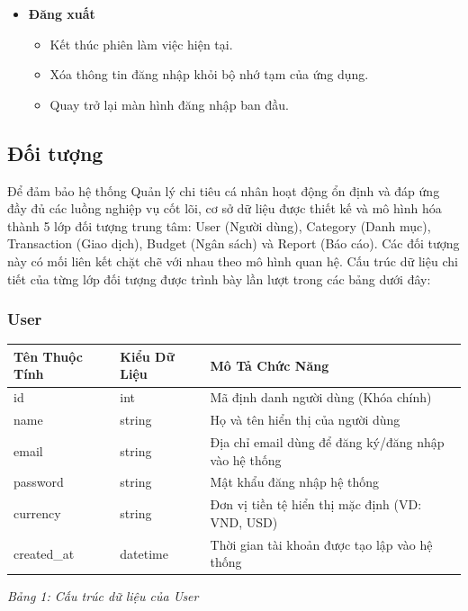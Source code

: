 \documentclass[12pt,letterpaper]{article}
\begin{document}
\begin{itemize}
\item \textbf{Đăng xuất}
\begin{itemize}
\item Kết thúc phiên làm việc hiện tại.
\item Xóa thông tin đăng nhập khỏi bộ nhớ tạm của ứng dụng.
\item Quay trở lại màn hình đăng nhập ban đầu.
\end{itemize}

\end{itemize}

\subsection{Đối tượng}
Để đảm bảo hệ thống Quản lý chi tiêu cá nhân hoạt động ổn định và đáp ứng đầy đủ các luồng nghiệp vụ cốt lõi, cơ sở dữ liệu được thiết kế và mô hình hóa thành 5 lớp đối tượng trung tâm: User (Người dùng), Category (Danh mục), Transaction (Giao dịch), Budget (Ngân sách) và Report (Báo cáo). Các đối tượng này có mối liên kết chặt chẽ với nhau theo mô hình quan hệ. Cấu trúc dữ liệu chi tiết của từng lớp đối tượng được trình bày lần lượt trong các bảng dưới đây:

\subsubsection{User}
\begin{center}
    \begin{tabular}{|l|l|p{8.5cm}|}
        \hline
        \textbf{Tên Thuộc Tính} & \textbf{Kiểu Dữ Liệu} & \textbf{Mô Tả Chức Năng} \\ \hline
        id & int & Mã định danh người dùng (Khóa chính) \\ \hline
        name & string & Họ và tên hiển thị của người dùng \\ \hline
        email & string & Địa chỉ email dùng để đăng ký/đăng nhập vào hệ thống \\ \hline
        password & string & Mật khẩu đăng nhập hệ thống \\ \hline
        currency & string & Đơn vị tiền tệ hiển thị mặc định (VD: VND, USD) \\ \hline
        created\_at & datetime & Thời gian tài khoản được tạo lập vào hệ thống \\ \hline
    \end{tabular}
    
    \vspace{0.2cm}
    \textit{Bảng 1: Cấu trúc dữ liệu của User}
\end{center}
\end{document}
